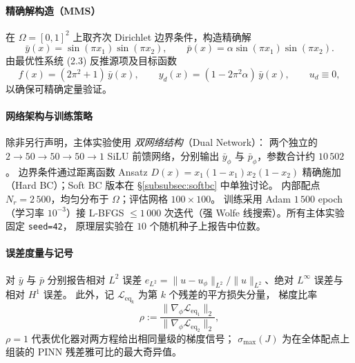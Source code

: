 \documentclass{xmu}
\theoremstyle{plain}
\theoremstyle{remark}
\begin{document}

\label{subsec:exp-setup}

\paragraph{精确解构造（MMS）}
在 $\Omega = [0,1]^2$ 上取齐次 Dirichlet 边界条件，构造精确解
\[
  \bar{y}(x) = \sin(\pi x_1)\sin(\pi x_2), \qquad
  \bar{p}(x) = \alpha\sin(\pi x_1)\sin(\pi x_2).
\]
由最优性系统 (2.3) 反推源项及目标函数
\[
  f(x) = (2\pi^2 + 1)\,\bar{y}(x), \qquad
  y_d(x) = (1 - 2\pi^2\alpha)\,\bar{y}(x), \qquad
  u_d \equiv 0,
\]
以确保可精确定量验证。

\paragraph{网络架构与训练策略}
除非另行声明，主体实验使用 \emph{双网络结构}（Dual Network）：
两个独立的 $2\to 50\to 50\to 50\to 1$ SiLU 前馈网络，分别输出
$\bar{y}_\phi$ 与 $\bar{p}_\phi$，参数合计约 $10\,502$。
边界条件通过距离函数 Ansatz $D(x) = x_1(1-x_1)x_2(1-x_2)$ 精确施加
（Hard BC）；Soft BC 版本在 §\ref{subsubsec:softbc} 中单独讨论。
内部配点 $N_r = 2\,500$，均匀分布于 $\Omega$；评估网格 $100\times 100$。
训练采用 Adam $1\,500$ epoch（学习率 $10^{-3}$）接 L-BFGS $\le 1\,000$
次迭代（强 Wolfe 线搜索）。所有主体实验固定 \texttt{seed=42}，
原理层实验在 $10$ 个随机种子上报告中位数。

\paragraph{误差度量与记号}
对 $\bar y$ 与 $\bar p$ 分别报告相对 $L^2$ 误差
$e_{L^2}=\|u-u_\phi\|_{L^2}/\|u\|_{L^2}$、绝对 $L^\infty$ 误差与
相对 $H^1$ 误差。
此外，记 $\mathcal L_{\mathrm{eq}_k}$ 为第 $k$ 个残差的平方损失分量，
梯度比率
\[
  \rho := \frac{\|\nabla_\phi \mathcal L_{\mathrm{eq}_1}\|_2}
               {\|\nabla_\phi \mathcal L_{\mathrm{eq}_2}\|_2},
\]
$\rho = 1$ 代表优化器对两方程给出相同量级的梯度信号；
$\sigma_{\max}(J)$ 为在全体配点上组装的 PINN 残差雅可比的最大奇异值。
\end{document}
